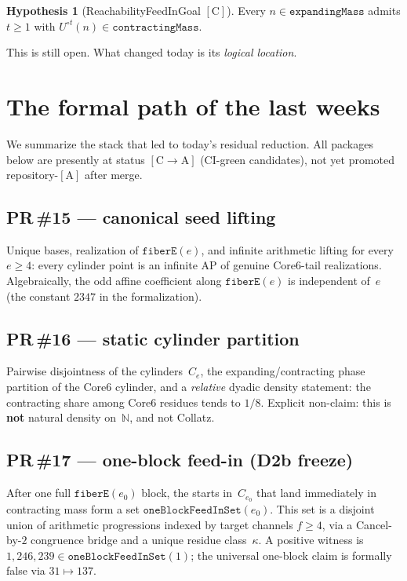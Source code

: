 \documentclass[11pt,a4paper]{article}
\theoremstyle{definition}
\newtheorem{hypothesis}[theorem]{Hypothesis}
\theoremstyle{remark}
\newcommand{\CA}{\ensuremath{[\mathrm{C}\!\to\!\mathrm{A}]}}
\newcommand{\tagA}{\ensuremath{[\mathrm{A}]}}
\newcommand{\tagC}{\ensuremath{[\mathrm{C}]}}
\newcommand{\Umap}{U}
\begin{document}
\begin{hypothesis}[ReachabilityFeedInGoal \tagC]
Every $n\in\mathtt{expandingMass}$ admits $t\ge 1$ with
$\Umap^{\circ t}(n)\in\mathtt{contractingMass}$.
\end{hypothesis}

This is still open.
What changed today is its \emph{logical location}.

\section{The formal path of the last weeks}

We summarize the stack that led to today's residual reduction.
All packages below are presently at status \CA{} (CI-green candidates), not yet
promoted repository-\tagA{} after merge.

\subsection{PR\,\#15 --- canonical seed lifting}
Unique bases, realization of $\mathtt{fiberE}(e)$, and infinite arithmetic
lifting for every $e\ge 4$:
every cylinder point is an infinite AP of genuine Core6-tail realizations.
Algebraically, the odd affine coefficient along $\mathtt{fiberE}(e)$ is
independent of~$e$ (the constant $2347$ in the formalization).

\subsection{PR\,\#16 --- static cylinder partition}
Pairwise disjointness of the cylinders~$C_e$, the expanding/contracting phase
partition of the Core6 cylinder, and a \emph{relative} dyadic density statement:
the contracting share among Core6 residues tends to $1/8$.
Explicit non-claim: this is \textbf{not} natural density on~$\mathbb{N}$, and
not Collatz.

\subsection{PR\,\#17 --- one-block feed-in (D2b freeze)}
After one full $\mathtt{fiberE}(e_0)$ block, the starts in~$C_{e_0}$ that land
immediately in contracting mass form a set
$\mathtt{oneBlockFeedInSet}(e_0)$.
This set is a disjoint union of arithmetic progressions indexed by target
channels $f\ge 4$, via a Cancel-by-$2$ congruence bridge and a unique residue
class~$\kappa$.
A positive witness is $1{,}246{,}239\in\mathtt{oneBlockFeedInSet}(1)$;
the universal one-block claim is formally false via $31\mapsto 137$.
\end{document}
